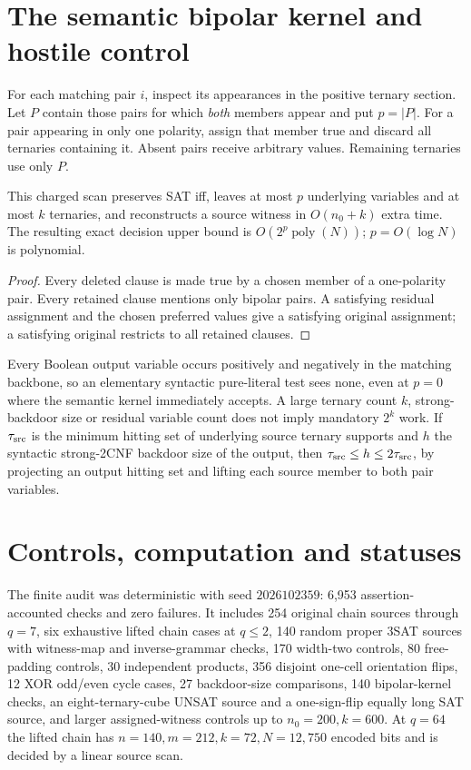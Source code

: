 \documentclass[11pt]{article}
\begin{document}
\section{The semantic bipolar kernel and hostile control}
For each matching pair $i$, inspect its appearances in the positive ternary section. Let $P$ contain those pairs for which \emph{both} members appear and put $p=|P|$. For a pair appearing in only one polarity, assign that member true and discard all ternaries containing it. Absent pairs receive arbitrary values. Remaining ternaries use only $P$.
\begin{lemma}
This charged scan preserves SAT iff, leaves at most $p$ underlying variables and at most $k$ ternaries, and reconstructs a source witness in $O(n_0+k)$ extra time. The resulting exact decision upper bound is $O(2^p\operatorname{poly}(N))$; $p=O(\log N)$ is polynomial.
\end{lemma}
\begin{proof}
Every deleted clause is made true by a chosen member of a one-polarity pair. Every retained clause mentions only bipolar pairs. A satisfying residual assignment and the chosen preferred values give a satisfying original assignment; a satisfying original restricts to all retained clauses.
\end{proof}
Every Boolean output variable occurs positively and negatively in the matching backbone, so an elementary syntactic pure-literal test sees none, even at $p=0$ where the semantic kernel immediately accepts. A large ternary count $k$, strong-backdoor size or residual variable count does not imply mandatory $2^k$ work. If $\tau_{\rm src}$ is the minimum hitting set of underlying source ternary supports and $h$ the syntactic strong-2CNF backdoor size of the output, then $\tau_{\rm src}\le h\le2\tau_{\rm src}$, by projecting an output hitting set and lifting each source member to both pair variables.
\section{Controls, computation and statuses}
The finite audit was deterministic with seed $2026102359$: 6,953 assertion-accounted checks and zero failures. It includes 254 original chain sources through $q=7$, six exhaustive lifted chain cases at $q\le2$, 140 random proper 3SAT sources with witness-map and inverse-grammar checks, 170 width-two controls, 80 free-padding controls, 30 independent products, 356 disjoint one-cell orientation flips, 12 XOR odd/even cycle cases, 27 backdoor-size comparisons, 140 bipolar-kernel checks, an eight-ternary-cube UNSAT source and a one-sign-flip equally long SAT source, and larger assigned-witness controls up to $n_0=200,k=600$. At $q=64$ the lifted chain has $n=140,m=212,k=72,N=12{,}750$ encoded bits and is decided by a linear source scan.
\end{document}
